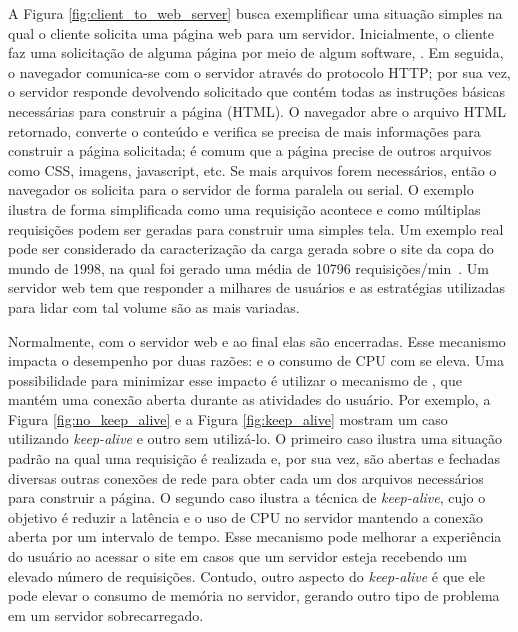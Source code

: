 A Figura \ref{fig:client_to_web_server} busca exemplificar uma situação simples
na qual o cliente solicita uma página web para um servidor. Inicialmente, o
cliente faz uma solicitação de alguma página por meio de algum software, . Em seguida, o navegador comunica-se com o
servidor através do protocolo HTTP; por sua vez, o servidor responde devolvendo
 solicitado que contém todas as instruções básicas necessárias para
construir a página (HTML). O navegador abre o arquivo HTML retornado, converte
o conteúdo e verifica se precisa de mais informações para construir a página
solicitada; é comum que a página precise de outros arquivos como CSS, imagens,
javascript, etc. Se mais arquivos forem necessários, então o navegador os solicita
para o servidor de forma paralela ou serial. O exemplo ilustra de
forma simplificada como uma requisição acontece e como múltiplas requisições
podem ser geradas para construir uma simples tela. Um exemplo real pode ser
considerado da caracterização da carga gerada sobre o site da copa do mundo de
1998, na qual foi gerado uma média de 10796 requisições/min~\citep{worldcup}.
Um servidor web tem que responder a milhares de usuários e as estratégias utilizadas
para lidar com tal volume são as mais variadas.

Normalmente,  com o
servidor web e ao final elas são encerradas. Esse mecanismo impacta o
desempenho por duas razões:  e o consumo de CPU com  se eleva. Uma possibilidade para minimizar esse impacto é utilizar
o mecanismo de , que mantém uma conexão
aberta durante as atividades do usuário. Por exemplo, a Figura
\ref{fig:no_keep_alive} e a Figura \ref{fig:keep_alive} mostram um caso
utilizando \emph{keep-alive} e outro sem utilizá-lo. O primeiro caso ilustra
uma situação padrão na qual uma requisição é realizada e, por sua vez, são abertas
e fechadas diversas outras conexões de rede para obter cada um dos arquivos necessários para
construir a página. O segundo caso ilustra a técnica de
\emph{keep-alive}, cujo o objetivo é reduzir a latência e o uso de CPU no
servidor mantendo a conexão aberta por um intervalo de tempo.  Esse mecanismo
pode melhorar a experiência do usuário ao acessar o site em casos que um
servidor esteja recebendo um elevado número de requisições. Contudo, outro
aspecto do \emph{keep-alive} é que ele pode elevar o consumo de memória no servidor,
gerando outro tipo de problema em um servidor sobrecarregado.

